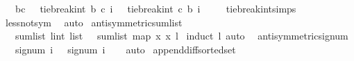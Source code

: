 \begin{isabellebody}
\ \ \ {\isachardoublequoteopen}b{\isasymnoteq}c\ \ {\isasymLongrightarrow}\ tie{\isacharunderscore}{\kern0pt}break{\isacharunderscore}{\kern0pt}int\ b\ c\ i\ {\isacharequal}{\kern0pt}\ {\isacharminus}{\kern0pt}\ tie{\isacharunderscore}{\kern0pt}break{\isacharunderscore}{\kern0pt}int\ c\ b\ {\isacharparenleft}{\kern0pt}{\isacharminus}{\kern0pt}i{\isacharparenright}{\kern0pt}{\isachardoublequoteclose}\isanewline
%
\isadelimproof
\ \ %
\endisadelimproof
%
\isatagproof
{}\isamarkupfalse%
\ \ tie{\isacharunderscore}{\kern0pt}break{\isacharunderscore}{\kern0pt}int{\isachardot}{\kern0pt}simps\ \isamarkupfalse%
\ less{\isacharunderscore}{\kern0pt}not{\isacharunderscore}{\kern0pt}sym\ \isamarkupfalse%
\ auto%
\endisatagproof
{\isafoldproof}%
%
\isadelimproof
\isanewline
%
\endisadelimproof
\isanewline
\isanewline
{}\isamarkupfalse%
\ antisymmetric{\isacharunderscore}{\kern0pt}sumlist{\isacharcolon}{\kern0pt}\isanewline
\ \ \ {\isachardoublequoteopen}sum{\isacharunderscore}{\kern0pt}list\ {\isacharparenleft}{\kern0pt}l{\isacharcolon}{\kern0pt}{\isacharcolon}{\kern0pt}int\ list{\isacharparenright}{\kern0pt}\ {\isacharequal}{\kern0pt}\ {\isacharminus}{\kern0pt}\ sum{\isacharunderscore}{\kern0pt}list\ {\isacharparenleft}{\kern0pt}map\ {\isacharparenleft}{\kern0pt}{\isasymlambda}x{\isachardot}{\kern0pt}\ {\isacharminus}{\kern0pt}x{\isacharparenright}{\kern0pt}\ l{\isacharparenright}{\kern0pt}\ {\isachardoublequoteclose}\isanewline
%
\isadelimproof
%
\endisadelimproof
%
\isatagproof
{}\isamarkupfalse%
{\isacharparenleft}{\kern0pt}induct\ l{\isacharcomma}{\kern0pt}\ auto{\isacharparenright}{\kern0pt}\ \isamarkupfalse%
%
\endisatagproof
{\isafoldproof}%
%
\isadelimproof
\isanewline
%
\endisadelimproof
\isanewline
\isanewline
{}\isamarkupfalse%
\ antisymmetric{\isacharunderscore}{\kern0pt}signum{\isacharcolon}{\kern0pt}\isanewline
\ \ \ {\isachardoublequoteopen}signum\ i\ {\isacharequal}{\kern0pt}\ {\isacharminus}{\kern0pt}\ {\isacharparenleft}{\kern0pt}signum\ {\isacharparenleft}{\kern0pt}{\isacharminus}{\kern0pt}i{\isacharparenright}{\kern0pt}{\isacharparenright}{\kern0pt}{\isachardoublequoteclose}\isanewline
%
\isadelimproof
\ \ %
\endisadelimproof
%
\isatagproof
{}\isamarkupfalse%
\ auto%
\endisatagproof
{\isafoldproof}%
%
\isadelimproof
\isanewline
%
\endisadelimproof
\isanewline
\isanewline
\isanewline
{}\isamarkupfalse%
\ append{\isacharunderscore}{\kern0pt}diff{\isacharunderscore}{\kern0pt}sorted{\isacharunderscore}{\kern0pt}set{\isacharcolon}{\kern0pt}\isanewline

\end{isabellebody}
